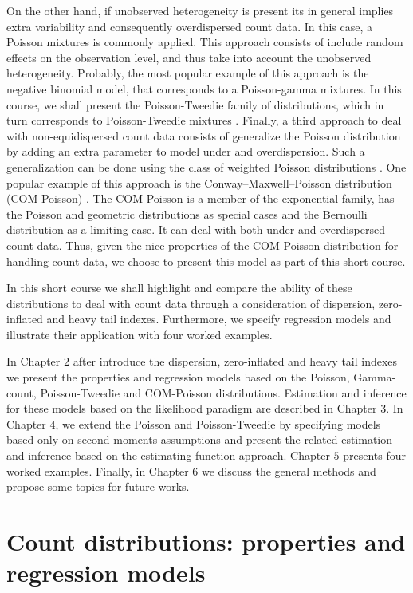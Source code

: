 \documentclass[9pt,a5paper,]{book}
\begin{document}
On the other hand, if unobserved heterogeneity is present its in general
implies extra variability and consequently overdispersed count data. In
this case, a Poisson mixtures is commonly applied. This approach
consists of include random effects on the observation level, and thus
take into account the unobserved heterogeneity. Probably, the most
popular example of this approach is the negative binomial model, that
corresponds to a Poisson-gamma mixtures. In this course, we shall
present the Poisson-Tweedie family of distributions, which in turn
corresponds to Poisson-Tweedie mixtures
\citep{Bonat2016b, Jorgensen2014}. Finally, a third approach to deal
with non-equidispersed count data consists of generalize the Poisson
distribution by adding an extra parameter to model under and
overdispersion. Such a generalization can be done using the class of
weighted Poisson distributions \citep{DelCastillo1998}. One popular
example of this approach is the Conway--Maxwell--Poisson distribution
(COM-Poisson) \citep{Sellers2010}. The COM-Poisson is a member of the
exponential family, has the Poisson and geometric distributions as
special cases and the Bernoulli distribution as a limiting case. It can
deal with both under and overdispersed count data. Thus, given the nice
properties of the COM-Poisson distribution for handling count data, we
choose to present this model as part of this short course.

In this short course we shall highlight and compare the ability of these
distributions to deal with count data through a consideration of
dispersion, zero-inflated and heavy tail indexes. Furthermore, we
specify regression models and illustrate their application with four
worked examples.

In Chapter \(2\) after introduce the dispersion, zero-inflated and heavy
tail indexes we present the properties and regression models based on
the Poisson, Gamma-count, Poisson-Tweedie and COM-Poisson distributions.
Estimation and inference for these models based on the likelihood
paradigm are described in Chapter \(3\). In Chapter \(4\), we extend the
Poisson and Poisson-Tweedie by specifying models based only on
second-moments assumptions and present the related estimation and
inference based on the estimating function approach. Chapter \(5\)
presents four worked examples. Finally, in Chapter \(6\) we discuss the
general methods and propose some topics for future works.

\chapter{Count distributions: properties and regression
models}\label{count-distributions-properties-and-regression-models}
\end{document}
